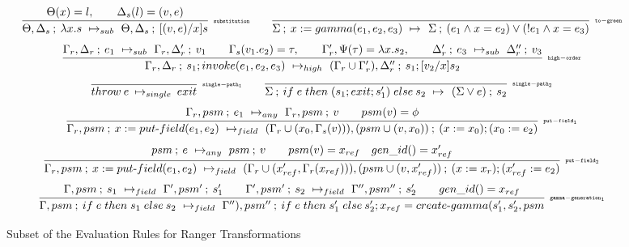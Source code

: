 \begin{figure*}[t]
{{$$
\infer[\rn{substitution}]
 {\step{\Theta, \Delta_s}{\lambda x.s}{\Theta, \Delta_s}{\sub{(v,e)}{x}{s}}{sub}}
 {\lookup{\Theta}{x} = l , \qquad \lookup{\Delta_s}{l}=(v,e)}
\qquad
\infer[\rn{to-green}]
 {\step{\Sigma}{x := gamma(e_1, e_2, e_3)}{\Sigma}{( e_1 \wedge x = e_2) \vee ( !e_1 \wedge x = e_3)}{}}
 {}
$$
$$
\infer[\rn{high-order}]
 {\step{\Gamma_r, \Delta_r}{s_1; invoke(e_1, e_2, e_3)}{(\Gamma_r \cup \Gamma_r'), \Delta_r''}{s_1; \sub{v_2}{x}{s_2}}{high}}
 {\step{\Gamma_r, \Delta_r}{e_1}{\Gamma_r, \Delta_r'}{v_1}{sub} \qquad \lookup{\Gamma_s}{v_1.e_2} = \tau , \qquad \Gamma_r', \lookup{\Psi}{\tau}=\lambda x.s_2, \qquad \step{\Delta_r'}{e_3}{\Delta_r''}{v_3}{sub}}
$$
$$
 \infer[\rn{single-path_1}]
 {\sstep{throw \:e}{single}{exit}}
 {}
\qquad
\infer[\rn{single-path_2}]
 {\step{\Sigma}{\ifr{e}{(s_1 ; exit ; s_1' )}{s_2}}{(\Sigma \vee e)}{s_2}{}}
 {}
$$
$$
\infer[\rn{put-field_1}]
 {\step{\Gamma_r, psm}{x := put\text{-}field(e_1, e_2)}{(\Gamma_r \cup (x_0, \Gamma_s{(v)})), (psm\cup(v, x_0))}{ (x := x_0); (x_0 := e_2)}{field}}
 {\step{\Gamma_r, psm}{e_1}{\Gamma_r, psm}{v}{any} \qquad psm(v) = \phi }
$$
$$
\infer[\rn{put-field_2}]
 {\step{\Gamma_r, psm}{x := put\text{-}field(e_1, e_2)}{(\Gamma_r \cup (x_{ref}', \Gamma_r(x_{ref}))), (psm\cup(v, x_{ref}'))}{ (x := x_r) ; (x_{ref}' := e_2)}{field}}
 {\step{psm}{e}{psm}{v}{any} \qquad psm(v) = x_{ref} \quad gen\_id() = x_{ref}'}
$$
$$
\infer[\rn{gamma-generation_1}]
 {\step{\Gamma, psm}{\ifr{e}{s_1}{s_2}}{\Gamma''), psm''}{\ifr{e}{s_1'}{s_2'} ; x_{ref} = create\text{-}gamma(s_1', s_2', psm}{field}}
 {\step{\Gamma, psm}{s_1}{\Gamma', psm'}{s_1'}{field} \qquad 
 \step{\Gamma', psm'}{s_2}{\Gamma'', psm''}{s_2'}{field}  \qquad gen\_id() = x_{ref}}
$$
}}
\caption{Subset of the Evaluation Rules for Ranger Transformations}
\label{fig:semantics}
\end{figure*}
%
